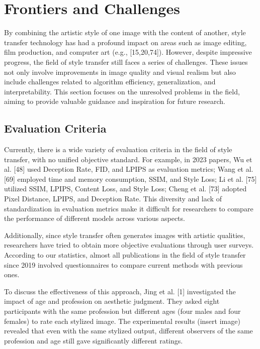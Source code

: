 \section{Frontiers and Challenges}

By combining the artistic style of one image with the content of another, style transfer technology has had a profound impact on areas such as image editing, film production, and computer art (e.g., [15,20,74]).
However, despite impressive progress, the field of style transfer still faces a series of challenges. These issues not only involve improvements in image quality and visual realism but also include challenges related to algorithm efficiency, generalization, and interpretability. This section focuses on the unresolved problems in the field, aiming to provide valuable guidance and inspiration for future research.

\subsection{Evaluation Criteria}

Currently, there is a wide variety of evaluation criteria in the field of style transfer, with no unified objective standard. For example, in 2023 papers, Wu et al. [48] used Deception Rate, FID, and LPIPS as evaluation metrics; Wang et al. [69] employed time and memory consumption, SSIM, and Style Loss; Li et al. [75] utilized SSIM, LPIPS, Content Loss, and Style Loss; Cheng et al. [73] adopted Pixel Distance, LPIPS, and Deception Rate. This diversity and lack of standardization in evaluation metrics make it difficult for researchers to compare the performance of different models across various aspects.

Additionally, since style transfer often generates images with artistic qualities, researchers have tried to obtain more objective evaluations through user surveys. According to our statistics, almost all publications in the field of style transfer since 2019 involved questionnaires to compare current methods with previous ones.

To discuss the effectiveness of this approach, Jing et al. [1] investigated the impact of age and profession on aesthetic judgment. They asked eight participants with the same profession but different ages (four males and four females) to rate each stylized image. The experimental results (insert image) revealed that even with the same stylized output, different observers of the same profession and age still gave significantly different ratings.

